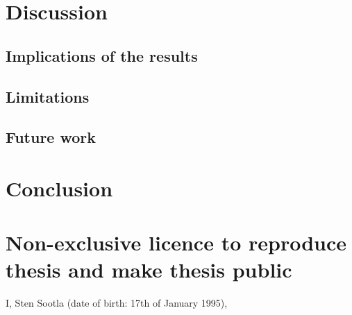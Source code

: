 \documentclass[12pt]{article}
\begin{document}
\newpage
\section{Discussion}
\subsection{Implications of the results}
\subsection{Limitations}
\subsection{Future work}

\newpage
\section*{Conclusion}


\newpage




\appendix
\pagebreak
\section*{\small Non-exclusive licence to reproduce thesis and make thesis public}


I, Sten Sootla (date of birth: 17th of January 1995),
\end{document}
